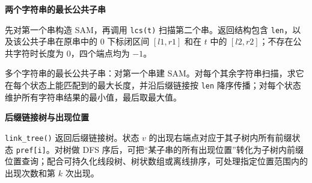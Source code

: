 \textbf{两个字符串的最长公共子串}

先对第一个串构造 SAM，再调用 \texttt{lcs(t)} 扫描第二个串。返回结构包含 \texttt{len}，以及该公共子串在原串中的 $0$ 下标闭区间 $[l1,r1]$ 和在 $t$ 中的 $[l2,r2]$；不存在公共字符时长度为 $0$，四个端点均为 $-1$。

多个字符串的最长公共子串：对第一个串建 SAM。对每个其余字符串扫描，求它在每个状态上能匹配到的最大长度，并沿后缀链接按 \texttt{len} 降序传播；对每个状态维护所有字符串结果的最小值，最后取最大值。

\textbf{后缀链接树与出现位置}

\texttt{link\_tree()} 返回后缀链接树。状态 $v$ 的出现右端点对应于其子树内所有前缀状态 \texttt{pref[i]}。对树做 DFS 序后，可把“某子串的所有出现位置”转化为子树内前缀位置查询；配合可持久化线段树、树状数组或离线排序，可处理指定位置范围内的出现次数和第 $k$ 次出现。
